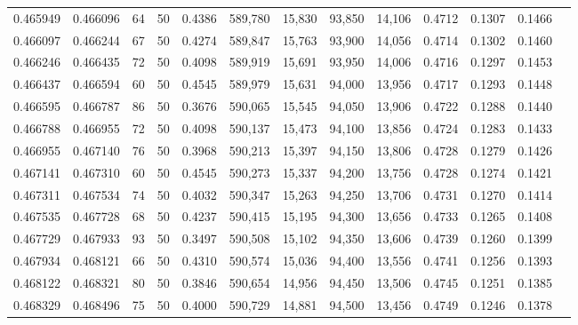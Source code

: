 \begin{tabular}{rrrrrrrrrrrrr}
0.465949 & 0.466096 &    64 &  50 &                                     0.4386 & 589,780 &  15,830 &  93,850 &  14,106 & 0.4712 & 0.1307 & 0.1466 \\
0.466097 & 0.466244 &    67 &  50 &                                     0.4274 & 589,847 &  15,763 &  93,900 &  14,056 & 0.4714 & 0.1302 & 0.1460 \\
0.466246 & 0.466435 &    72 &  50 &                                     0.4098 & 589,919 &  15,691 &  93,950 &  14,006 & 0.4716 & 0.1297 & 0.1453 \\
0.466437 & 0.466594 &    60 &  50 &                                     0.4545 & 589,979 &  15,631 &  94,000 &  13,956 & 0.4717 & 0.1293 & 0.1448 \\
0.466595 & 0.466787 &    86 &  50 &                                     0.3676 & 590,065 &  15,545 &  94,050 &  13,906 & 0.4722 & 0.1288 & 0.1440 \\
0.466788 & 0.466955 &    72 &  50 &                                     0.4098 & 590,137 &  15,473 &  94,100 &  13,856 & 0.4724 & 0.1283 & 0.1433 \\
0.466955 & 0.467140 &    76 &  50 &                                     0.3968 & 590,213 &  15,397 &  94,150 &  13,806 & 0.4728 & 0.1279 & 0.1426 \\
0.467141 & 0.467310 &    60 &  50 &                                     0.4545 & 590,273 &  15,337 &  94,200 &  13,756 & 0.4728 & 0.1274 & 0.1421 \\
0.467311 & 0.467534 &    74 &  50 &                                     0.4032 & 590,347 &  15,263 &  94,250 &  13,706 & 0.4731 & 0.1270 & 0.1414 \\
0.467535 & 0.467728 &    68 &  50 &                                     0.4237 & 590,415 &  15,195 &  94,300 &  13,656 & 0.4733 & 0.1265 & 0.1408 \\
0.467729 & 0.467933 &    93 &  50 &                                     0.3497 & 590,508 &  15,102 &  94,350 &  13,606 & 0.4739 & 0.1260 & 0.1399 \\
0.467934 & 0.468121 &    66 &  50 &                                     0.4310 & 590,574 &  15,036 &  94,400 &  13,556 & 0.4741 & 0.1256 & 0.1393 \\
0.468122 & 0.468321 &    80 &  50 &                                     0.3846 & 590,654 &  14,956 &  94,450 &  13,506 & 0.4745 & 0.1251 & 0.1385 \\
0.468329 & 0.468496 &    75 &  50 &                                     0.4000 & 590,729 &  14,881 &  94,500 &  13,456 & 0.4749 & 0.1246 & 0.1378 \\

\end{tabular}
